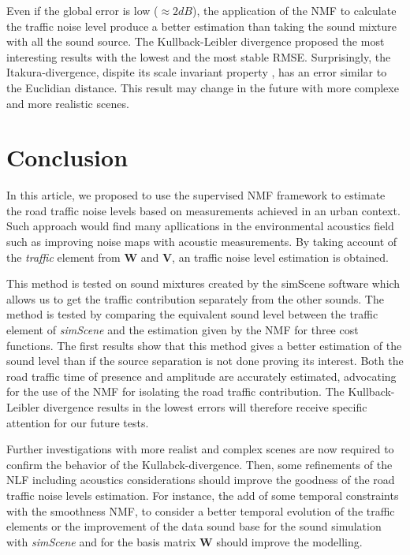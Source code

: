 \documentclass{article}
\begin{document}
\begin{sloppy}
Even if the global error is low ($\approx 2 dB$), the application of the NMF to calculate the traffic noise level produce a better estimation than taking the sound mixture with all the sound source. The Kullback-Leibler divergence proposed the most interesting results with the lowest and the most stable RMSE. 
Surprisingly, the Itakura-divergence, dispite its scale invariant property \cite{fevotte2011}, has an error similar to the Euclidian distance. This result may change in the future with more complexe and more realistic scenes.


\section{Conclusion}

In this article, we proposed to use the supervised NMF framework to estimate the road traffic noise levels based on measurements achieved in an urban context. Such approach would find many apllications in the environmental acoustics field such as improving noise maps with acoustic measurements. By taking account of the \textit{traffic} element from $\mathbf{W}$ and $\mathbf{V}$, an traffic noise level estimation is obtained.

This method is tested on sound mixtures created by the simScene software which allows us to get the traffic contribution separately from the other sounds. The method is tested by comparing the equivalent sound level between the traffic element of \textit{simScene} and the estimation given by the NMF for three cost functions. The first results show that this method gives a better estimation of the sound level than if the source separation is not done proving its interest. Both the road traffic time of presence and amplitude are accurately estimated, advocating for the use of the NMF for isolating the road traffic contribution. The Kullback-Leibler divergence results in the lowest errors will therefore receive specific attention for our future tests. 

Further investigations with more realist and complex scenes are now required to confirm the behavior of the Kullabck-divergence. Then, some refinements of the NLF including acoustics considerations should improve the goodness of the road traffic noise levels estimation. For instance, the add of some temporal constraints with the smoothness NMF, to consider a better temporal evolution of the traffic elements or the improvement of the data sound base for the sound simulation with \textit{simScene} and for the basis matrix $\mathbf{W}$ should improve the modelling.


\end{sloppy}
\end{document}
